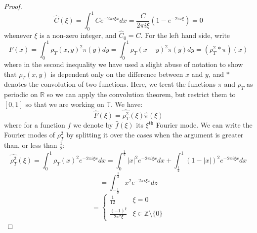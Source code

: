 \documentclass{article}
\begin{document}
\begin{proof}
    \begin{equation}
        \hat{C}(\xi) = \int_0^1 Ce^{-2\pi i \xi x}dx = \frac{C}{2\pi i \xi} \left(1-e^{-2\pi i\xi}\right) = 0
    \end{equation}
    whenever $\xi$ is a non-zero integer, and $\hat{C}_0 = C$. For the left hand side, write
    \begin{equation}
        F(x) = \int_0^1\rho_T(x,y)^2\pi(y)dy = \int_0^1 \rho_T(x-y)^2\pi(y)dy = (\rho_T^2 \ast \pi)(x) 
    \end{equation}
    where in the second inequality we have used a slight abuse of notation to show that $\rho_T(x,y)$ is dependent only on the difference between $x$ and $y$, and $\ast$ denotes the convolution of two functions. Here, we treat the functions $\pi$ and $\rho_T$ as periodic on $\mathbb{R}$ so we can apply the convolution theorem, but restrict them to $[0,1]$ so that we are working on $\mathbb{T}$. We have:
    \begin{equation}
        \label{eq:fourier_product}
        \hat{F}(\xi) = \widehat{\rho_T^2}(\xi)\hat{\pi}(\xi)
    \end{equation}
    where for a function $f$ we denote by $\hat{f}(\xi)$ its $\xi^{\text{th}}$ Fourier mode. We can write the Fourier modes of $\rho_T^2$ by splitting it over the cases when the argument is greater than, or less than $\frac{1}{2}$:
    \begin{equation}
        \widehat{\rho_T^2}(\xi) = \int_0^1 \rho_T(x)^2e^{-2\pi i \xi x}dx = \int_0^{\frac{1}{2}} |x|^2e^{-2\pi i \xi x}dx + \int_{\frac{1}{2}}^1(1-|x|)^2e^{-2\pi i \xi  x}dx
    \end{equation}
    \begin{equation}
        = \int_{-\frac{1}{2}}^{\frac{1}{2}} x^2e^{-2 \pi i \xi x}dz
    \end{equation}
    \begin{equation}
        = \begin{cases}
            \frac{1}{12} & \xi = 0 \\
            \frac{(-1)^{\xi}}{2\pi^2\xi} & \xi \in \mathbb{Z}\setminus\{0\}
        \end{cases}
    \end{equation}

\end{proof}
\end{document}
